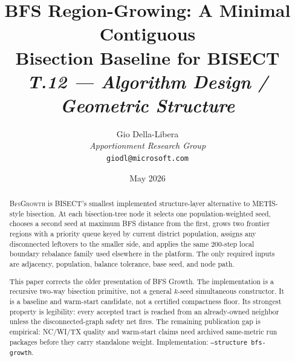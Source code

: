 \documentclass[12pt]{article}
\title{%
  \textbf{BFS Region-Growing: A Minimal Contiguous}\\
  \textbf{Bisection Baseline for BISECT}\\[0.8em]
  \normalsize\textit{T.12 --- Algorithm Design / Geometric Structure}%
}
\author{%
  Gio Della-Libera\\
  \textit{Apportionment Research Group}\\
  \small\texttt{giodl@microsoft.com}
}
\date{May 2026}
\newcommand{\bfsg}{\textsc{BfsGrowth}}
\begin{document}
\maketitle

\begin{abstract}
\noindent
\bfsg{} is BISECT's smallest implemented structure-layer alternative to
METIS-style bisection. At each bisection-tree node it selects one
population-weighted seed, chooses a second seed at maximum BFS distance from
the first, grows two frontier regions with a priority queue keyed by current
district population, assigns any disconnected leftovers to the smaller side,
and applies the same 200-step local boundary rebalance family used elsewhere
in the platform. The only required inputs are adjacency, population, balance
tolerance, base seed, and node path.

This paper corrects the older presentation of BFS Growth. The implementation is
a recursive two-way bisection primitive, not a general $k$-seed simultaneous
constructor. It is a baseline and warm-start candidate, not a certified
compactness floor. Its strongest property is legibility: every accepted tract
is reached from an already-owned neighbor unless the disconnected-graph safety
net fires. The remaining publication gap is empirical: NC/WI/TX quality and
warm-start claims need archived same-metric run packages before they carry
standalone weight. Implementation: \texttt{--structure bfs-growth}.
\end{abstract}










\end{document}
